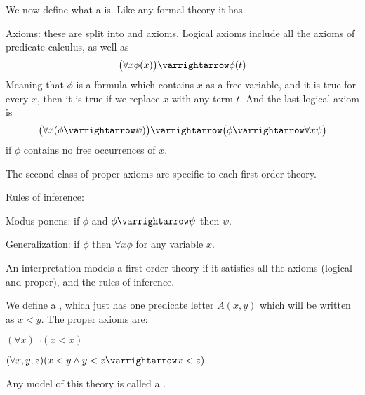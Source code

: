 \documentclass[10pt]{article}
\let\to=\varrightarrow
\begin{document}
\begin{defn*}

    We now define what a  is.
    Like any formal theory it has
    \benum
        \item Axioms: these are split into  and  axioms.
        Logical axioms include all the axioms of predicate calculus, as well as
        \[ \bigl(\forall x\phi(x)\bigr)\to\phi(t) \]
        Meaning that $\phi$ is a formula which contains $x$ as a free variable, and it is true for every $x$, then it is true if we replace $x$ with any term $t$.
        And the last logical axiom is
        \[ \bigl(\forall x(\phi\to\psi)\bigr)\to\bigl(\phi\to\forall x\psi\bigr) \]
        if $\phi$ contains no free occurrences of $x$.

        The second class of proper axioms are specific to each first order theory.

        \item Rules of inference:
        \benum
            \item Modus ponens: if $\phi$ and $\phi\to\psi$ then $\psi$.
            \item Generalization: if $\phi$ then $\forall x\phi$ for any variable $x$.
        \eenum
    \eenum

    An interpretation models a first order theory if it satisfies all the axioms (logical and proper), and the rules of inference.

\end{defn*}

\begin{exam*}

    We define a , which just has one predicate letter $A(x,y)$ which will be written as $x<y$.
    The proper axioms are:
    \benum
        \item $(\forall x)\neg(x<x)$
        \item $(\forall x,y,z)(x<y\land y<z\to x<z)$
    \eenum

    Any model of this theory is called a .

\end{exam*}
\end{document}
